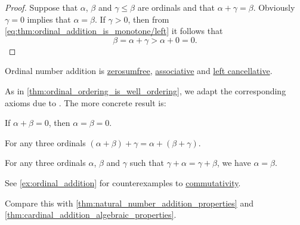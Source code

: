 \begin{proof}
  \NecessitySubProof Suppose that \( \alpha \), \( \beta \) and \( \gamma \leq \beta \) are ordinals and that \( \alpha + \gamma = \beta \). Obviously \( \gamma = 0 \) implies that \( \alpha = \beta \). If \( \gamma > 0 \), then from \eqref{eq:thm:ordinal_addition_is_monotone/left} it follows that
  \begin{equation*}
     \beta = \alpha + \gamma > \alpha + 0 = 0.
  \end{equation*}
\end{proof}

\begin{proposition}\label{thm:ordinal_addition_algebraic_properties}
  Ordinal number addition is \hyperref[def:zerosumfree]{zerosumfree}, \hyperref[def:binary_operation/associative]{associative} and \hyperref[def:binary_operation/cancellative]{left cancellative}.

  As in \cref{thm:ordinal_ordering_is_well_ordering}, we adapt the corresponding axioms due to . The more concrete result is:
  \begin{thmenum}
     If \( \alpha + \beta = 0 \), then \( \alpha = \beta = 0 \).

     For any three ordinals \( (\alpha + \beta) + \gamma = \alpha + (\beta + \gamma) \).

     For any three ordinals \( \alpha \), \( \beta \) and \( \gamma \) such that \( \gamma + \alpha = \gamma + \beta \), we have \( \alpha = \beta \).
  \end{thmenum}

   See \cref{ex:ordinal_addition} for counterexamples to \hyperref[def:binary_operation/commutative]{commutativity}.

   Compare this with \cref{thm:natural_number_addition_properties} and \cref{thm:cardinal_addition_algebraic_properties}.
\end{proposition}
